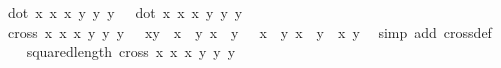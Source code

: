 \begin{isabellebody}
\ \ {\isacharparenleft}{\kern0pt}dot\ {\isacharparenleft}{\kern0pt}x{}{\isacharcomma}{\kern0pt}\ x{}{\isacharcomma}{\kern0pt}\ x{}{\isacharparenright}{\kern0pt}\ {\isacharparenleft}{\kern0pt}y{}{\isacharcomma}{\kern0pt}\ y{}{\isacharcomma}{\kern0pt}\ y{}{\isacharparenright}{\kern0pt}{\isacharparenright}{\kern0pt}\ {\isacharasterisk}{\kern0pt}\ \ {\isacharparenleft}{\kern0pt}dot\ {\isacharparenleft}{\kern0pt}x{}{\isacharcomma}{\kern0pt}\ x{}{\isacharcomma}{\kern0pt}\ x{}{\isacharparenright}{\kern0pt}\ {\isacharparenleft}{\kern0pt}y{}{\isacharcomma}{\kern0pt}\ y{}{\isacharcomma}{\kern0pt}\ y{}{\isacharparenright}{\kern0pt}{\isacharparenright}{\kern0pt}{\isachardoublequoteclose}\isanewline
%
\isadelimproof
%
\endisadelimproof
%
\isatagproof
{}\isamarkupfalse%
\ {\isacharminus}{\kern0pt}\isanewline
\ \ \isamarkupfalse%
\ {}{\isacharcolon}{\kern0pt}\ {\isachardoublequoteopen}cross\ {\isacharparenleft}{\kern0pt}x{}{\isacharcomma}{\kern0pt}\ x{}{\isacharcomma}{\kern0pt}\ x{}{\isacharparenright}{\kern0pt}\ {\isacharparenleft}{\kern0pt}y{}{\isacharcomma}{\kern0pt}\ y{}{\isacharcomma}{\kern0pt}\ y{}{\isacharparenright}{\kern0pt}\ {\isacharequal}{\kern0pt}\ \ {\isacharparenleft}{\kern0pt}x{}{\isacharasterisk}{\kern0pt}y{}\ {\isacharminus}{\kern0pt}\ x{}\ {\isacharasterisk}{\kern0pt}\ y{}{\isacharcomma}{\kern0pt}\ x{}\ {\isacharasterisk}{\kern0pt}\ y{}\ \ {\isacharminus}{\kern0pt}\ x{}\ {\isacharasterisk}{\kern0pt}\ y{}{\isacharcomma}{\kern0pt}\ x{}\ {\isacharasterisk}{\kern0pt}\ y{}\ {\isacharminus}{\kern0pt}\ x{}{\isacharasterisk}{\kern0pt}\ y{}{\isacharparenright}{\kern0pt}{\isachardoublequoteclose}\ \isamarkupfalse%
\ {\isacharparenleft}{\kern0pt}simp\ add{\isacharcolon}{\kern0pt}\ cross{\isacharunderscore}{\kern0pt}def{\isacharparenright}{\kern0pt}\isanewline
\ \ \isamarkupfalse%
\ {}{\isacharcolon}{\kern0pt}\ {\isachardoublequoteopen}squared{\isacharunderscore}{\kern0pt}length\ {\isacharparenleft}{\kern0pt}cross\ {\isacharparenleft}{\kern0pt}x{}{\isacharcomma}{\kern0pt}\ x{}{\isacharcomma}{\kern0pt}\ x{}{\isacharparenright}{\kern0pt}\ {\isacharparenleft}{\kern0pt}y{}{\isacharcomma}{\kern0pt}\ y{}{\isacharcomma}{\kern0pt}\ y{}{\isacharparenright}{\kern0pt}{\isacharparenright}{\kern0pt}\ {\isacharequal}{\kern0pt}\ \isanewline

\end{isabellebody}
